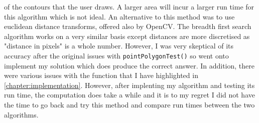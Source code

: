 \documentclass[11pt]{article}
\begin{document}
of the contours that the user draws. A larger area will incur a larger
run time for this algorithm which is not ideal. 
An alternative to this method was
to use euclidean distance transforms, offered also by OpenCV. The breadth
first search algorithm works on a very similar basis except distances
are more discretised as "distance in pixels" is a whole number. However,
I was very skeptical of its accuracy after the original issues with
\texttt{pointPolygonTest()} so went onto implement my solution which does produce
the correct answer. In addition, there were various issues with the function
that I have highlighted in \ref{chapter:implementation}. 
However, after implenting my algorithm and testing its run time,
the computation does take a while and it is
to my regret I did not have the time to go back and try this method and
compare run times between the two algorithms.
\end{document}
